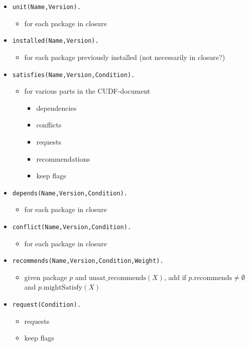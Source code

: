 \documentclass[a4paper,english]{article}
\begin{document}
\begin{itemize}
  \item \texttt{unit(Name,Version).}
    \begin{itemize}
      \item for each package in closure
    \end{itemize}
  \item \texttt{installed(Name,Version).}
    \begin{itemize}
      \item for each package previously installed (not necessarily in closure?)
    \end{itemize}
  \item \texttt{satisfies(Name,Version,Condition).}
    \begin{itemize}
      \item for various parts in the CUDF-document
        \begin{itemize}
          \item dependencies
          \item conflicts
          \item requests
          \item recommendations
          \item keep flags
        \end{itemize}
    \end{itemize}
  \item \texttt{depends(Name,Version,Condition).}
    \begin{itemize}
      \item for each package in closure
    \end{itemize}
  \item \texttt{conflict(Name,Version,Condition).}
    \begin{itemize}
      \item for each package in closure
    \end{itemize}
  \item \texttt{recommends(Name,Version,Condition,Weight).}
    \begin{itemize}
      \item given package $p$ and $\mathrm{unsat\_recommends}(X)$, add if $p.\mathrm{recommends}\not=\emptyset$ and $p.\mathrm{mightSatisfy}(X)$
    \end{itemize}
  \item \texttt{request(Condition).}
    \begin{itemize}
      \item requests
      \item keep flags

\end{itemize}
\end{itemize}
\end{document}
